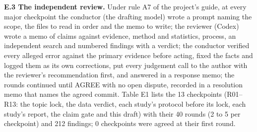 \documentclass[11pt,letterpaper]{article}
\begin{document}
\textbf{E.3 The independent review.} Under rule A7 of the project's guide, at every major checkpoint the conductor (the drafting model) wrote a prompt naming the scope, the files to read in order and the memo to write; the reviewer (Codex) wrote a memo of claims against evidence, method and statistics, process, an independent search and numbered findings with a verdict; the conductor verified every alleged error against the primary evidence before acting, fixed the facts and logged them as its own corrections, put every judgement call to the author with the reviewer's recommendation first, and answered in a response memo; the rounds continued until AGREE with no open dispute, recorded in a resolution memo that names the agreed commit. Table E1 lists the 13 checkpoints (R01--R13: the topic lock, the data verdict, each study's protocol before its lock, each study's report, the claim gate and this draft) with their 40 rounds (2 to 5 per checkpoint) and 212 findings; 0 checkpoints were agreed at their first round.
\end{document}
